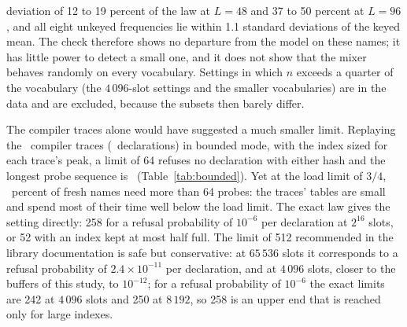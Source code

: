 deviation of 12 to 19 percent of the law at $L=48$ and 37 to 50 percent at $L=96$, and all eight unkeyed frequencies lie within 1.1 standard deviations of the keyed mean. The check therefore shows no departure from the model on these names; it has little power to detect a small one, and it does not show that the mixer behaves randomly on every vocabulary. Settings in which $n$ exceeds a quarter of the vocabulary (the $4\,096$-slot settings and the smaller vocabularies) are in the data and are excluded, because the subsets then barely differ.

\begin{table}[t!]
\label{tab:lawcheck}
\centering
\setlength{\tabcolsep}{3pt}
\resizebox{\columnwidth}{!}{}
\end{table}

\begin{table}[t!]
\label{tab:lawproc}
\centering
\setlength{\tabcolsep}{2pt}
\resizebox{\columnwidth}{!}{}
\end{table}

The compiler traces alone would have suggested a much smaller limit. Replaying the \BoundedTraces\ compiler traces (\BoundedDecls\ declarations) in bounded mode, with the index sized for each trace's peak, a limit of 64 refuses no declaration with either hash and the longest probe sequence is \BoundedLongest\ (Table~\ref{tab:bounded}). Yet at the load limit of $3/4$, \ProbeSixtyFour\ percent of fresh names need more than 64 probes: the traces' tables are small and spend most of their time well below the load limit. The exact law gives the setting directly: 258 for a refusal probability of $10^{-6}$ per declaration at $2^{16}$ slots, or 52 with an index kept at most half full. The limit of 512 recommended in the library documentation is safe but conservative: at $65\,536$ slots it corresponds to a refusal probability of $2.4\times10^{-11}$ per declaration, and at $4\,096$ slots, closer to the buffers of this study, to $10^{-12}$; for a refusal probability of $10^{-6}$ the exact limits are 242 at $4\,096$ slots and 250 at $8\,192$, so 258 is an upper end that is reached only for large indexes.

